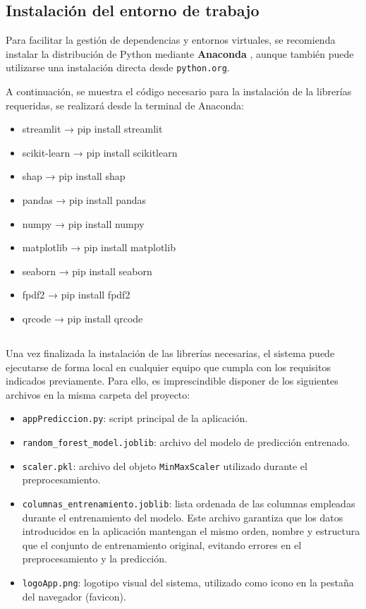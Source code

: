 \subsection {Instalación del entorno de trabajo}

Para facilitar la gestión de dependencias y entornos virtuales, se recomienda instalar la distribución de Python mediante \textbf{Anaconda} \cite{anaconda2025}, aunque también puede utilizarse una instalación directa desde \texttt{python.org}. \cite{python2025}

A continuación, se muestra el código necesario para la instalación de la librerías requeridas, se realizará desde la terminal de Anaconda:

\begin{itemize}
    \item streamlit →  pip install streamlit 
    \item scikit-learn → pip install scikitlearn
    \item shap →  pip install shap
    \item pandas → pip install pandas
    \item numpy → pip install numpy
    \item matplotlib → pip install matplotlib
    \item seaborn → pip install seaborn
    \item fpdf2 → pip install fpdf2
    \item qrcode → pip install qrcode
\end{itemize}


\subsection{\label{Ejecución local de la aplicación}}

Una vez finalizada la instalación de las librerías necesarias, el sistema puede ejecutarse de forma local en cualquier equipo que cumpla con los requisitos indicados previamente. Para ello, es imprescindible disponer de los siguientes archivos en la misma carpeta del proyecto:

\begin{itemize}
    \item \texttt{appPrediccion.py}: script principal de la aplicación.
    \item \texttt{random\_forest\_model.joblib}: archivo del modelo de predicción entrenado.
    \item \texttt{scaler.pkl}: archivo del objeto \texttt{MinMaxScaler} utilizado durante el preprocesamiento.
    \item \texttt{columnas\_entrenamiento.joblib}: lista ordenada de las columnas empleadas durante el entrenamiento del modelo. Este archivo garantiza que los datos introducidos en la aplicación mantengan el mismo orden, nombre y estructura que el conjunto de entrenamiento original, evitando errores en el preprocesamiento y la predicción.
    \item \texttt{logoApp.png}: logotipo visual del sistema, utilizado como icono en la pestaña del navegador (favicon).
\end{itemize}


